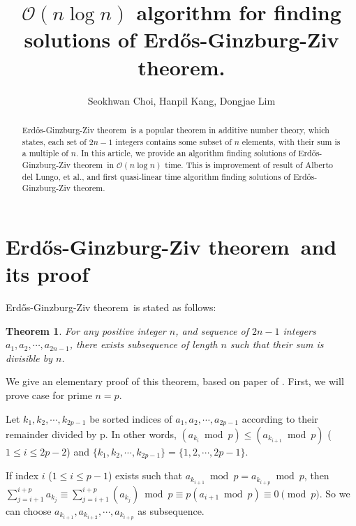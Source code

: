\documentclass[11pt]{article}
\newtheorem{theorem}{Theorem}
\newcommand{\EGZT}{Erd\H{o}s-Ginzburg-Ziv theorem}
\begin{document}
\title{$\mathcal{O}(n \log n)$ algorithm for finding solutions of Erdős-Ginzburg-Ziv theorem.}
 
\author{Seokhwan Choi, Hanpil Kang, Dongjae Lim}
\maketitle
\setcounter{page}{1}

\begin{abstract}
    \EGZT\ is a popular theorem in additive number theory, which states, each set of $2n-1$ integers contains some subset of $n$ elements, with their sum is a multiple of $n$. In this article, we provide an algorithm finding solutions of \EGZT\ in $\mathcal{O}(n \log n)$ time. This is improvement of result of Alberto del Lungo, et al., and first quasi-linear time algorithm finding solutions of \EGZT.
\end{abstract}


\section{\EGZT\ and its proof}

\EGZT\ is stated as follows: \cite{zbMATH03102822}

\begin{theorem} 

For any positive integer $n$, and sequence of $2n-1$ integers ${a}_{1}, {a}_{2}, \cdots, {a}_{2n-1}$, there exists subsequence of length $n$ such that their sum is divisible by $n$.

\end{theorem}

We give an elementary proof of this theorem, based on paper of \cite{zbMATH03102822}. First, we will prove case for prime $n = p$.

Let $k_1, k_2, \cdots, {k}_{2p-1}$ be sorted indices of ${a}_{1}, {a}_{2}, \cdots, {a}_{2p-1}$ according to their remainder divided by p. In other words, $({a}_{{k}_{i}} \bmod p) \le ({a}_{{k}_{i+1}} \bmod p)$ ($1 \le i \le 2p-2$) and $\{{k}_{1}, {k}_{2}, \cdots, {k}_{2p-1}\} = \{1, 2, \cdots, 2p-1\}$.

If index $i$ ($1 \le i \le p-1$) exists such that ${a}_{{k}_{i+1}} \bmod p = {a}_{{k}_{i+p}} \bmod p$, then $\sum_{j={i+1}}^{i+p} {a}_{{k}_{j}} \equiv
\sum_{j={i+1}}^{i+p} ({a}_{{k}_{j}}) \bmod p \equiv p({a}_{i+1} \bmod p) \equiv 0 \pmod p$. So we can choose $a_{k_{i+1}}, a_{k_{i+2}}, \cdots, a_{k_{i+p}}$ as subsequence.
\end{document}
